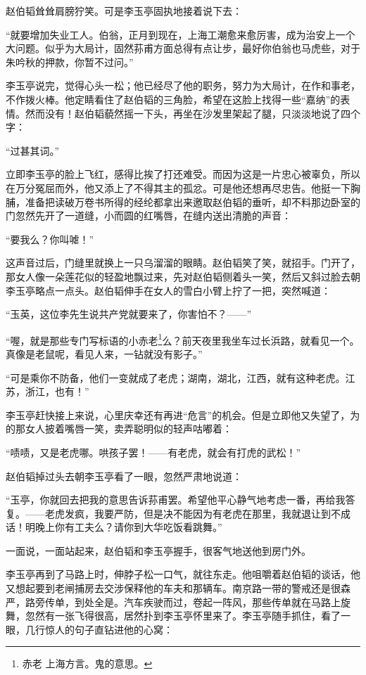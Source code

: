 \par 赵伯韬耸耸肩膀狞笑。可是李玉亭固执地接着说下去：
\par “就要增加失业工人。伯翁，正月到现在，上海工潮愈来愈厉害，成为治安上一个大问题。似乎为大局计，固然荪甫方面总得有点让步，最好你伯翁也马虎些，对于朱吟秋的押款，你暂不过问。”
\par 李玉亭说完，觉得心头一松；他已经尽了他的职务，努力为大局计，在作和事老，不作拨火棒。他定睛看住了赵伯韬的三角脸，希望在这脸上找得一些“嘉纳”的表情。然而没有！赵伯韬藐然摇一下头，再坐在沙发里架起了腿，只淡淡地说了四个字：
\par “过甚其词。”
\par 立即李玉亭的脸上飞红，感得比挨了打还难受。而因为这是一片忠心被辜负，所以在万分冤屈而外，他又添上了不得其主的孤忿。可是他还想再尽忠告。他挺一下胸脯，准备把读破万卷书所得的经纶都拿出来邀取赵伯韬的垂听，却不料那边卧室的门忽然先开了一道缝，小而圆的红嘴唇，在缝内送出清脆的声音：
\par “要我么？你叫㖸！”
\par 这声音过后，门缝里就换上一只乌溜溜的眼睛。赵伯韬笑了笑，就招手。门开了，那女人像一朵莲花似的轻盈地飘过来，先对赵伯韬侧着头一笑，然后又斜过脸去朝李玉亭略点一点头。赵伯韬伸手在女人的雪白小臂上拧了一把，突然喊道：
\par “玉英，这位李先生说共产党就要来了，你害怕不？——”
\par “喔，就是那些专门写标语的小赤老\footnote{赤老 上海方言。鬼的意思。}么？前天夜里我坐车过长浜路，就看见一个。真像是老鼠呢，看见人来，一钻就没有影子。”
\par “可是乘你不防备，他们一变就成了老虎；湖南，湖北，江西，就有这种老虎。江苏，浙江，也有！”
\par 李玉亭赶快接上来说，心里庆幸还有再进“危言”的机会。但是立即他又失望了，为的那女人披着嘴唇一笑，卖弄聪明似的轻声咕嘟着：
\par “啧啧，又是老虎哪。哄孩子罢！——有老虎，就会有打虎的武松！”
\par 赵伯韬掉过头去朝李玉亭看了一眼，忽然严肃地说道：
\par “玉亭，你就回去把我的意思告诉荪甫罢。希望他平心静气地考虑一番，再给我答复。——老虎发疯，我要严防，但是决不能因为有老虎在那里，我就退让到不成话！明晚上你有工夫么？请你到大华吃饭看跳舞。”
\par 一面说，一面站起来，赵伯韬和李玉亭握手，很客气地送他到房门外。
\par 李玉亭再到了马路上时，伸脖子松一口气，就往东走。他咀嚼着赵伯韬的谈话，他又想起要到老闸捕房去交涉保释他的车夫和那辆车。南京路一带的警戒还是很森严，路旁传单，到处全是。汽车疾驶而过，卷起一阵风，那些传单就在马路上旋舞，忽然有一张飞得很高，居然扑到李玉亭怀里来了。李玉亭随手抓住，看了一眼，几行惊人的句子直钻进他的心窝：

